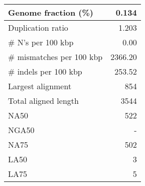 \documentclass[12pt,a4paper]{article}
\begin{document}
\begin{table}[ht]
\begin{center}
\begin{tabular}{|l*{1}{|r}|}
Genome fraction (\%) & 0.134 \\ \hline
Duplication ratio & 1.203 \\ \hline
\# N's per 100 kbp & 0.00 \\ \hline
\# mismatches per 100 kbp & 2366.20 \\ \hline
\# indels per 100 kbp & 253.52 \\ \hline
Largest alignment & 854 \\ \hline
Total aligned length & 3544 \\ \hline
NA50 & 522 \\ \hline
NGA50 & - \\ \hline
NA75 & 502 \\ \hline
LA50 & 3 \\ \hline
LA75 & 5 \\ \hline
\end{tabular}
\end{center}
\end{table}
\end{document}
